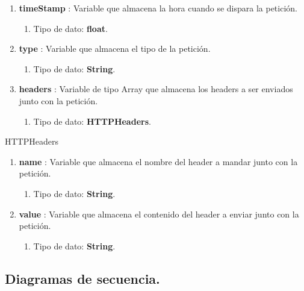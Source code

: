 \documentclass[12pt, a4paper, titlepage]{report}
\begin{document}
\begin{enumerate}
\begin{enumerate}
    		        \end{enumerate}
    		        \item \textbf{timeStamp} : Variable que almacena la hora cuando se dispara la petición.
    		        \begin{enumerate}
    		            \item Tipo de dato: \textbf{float}.
    		        \end{enumerate}
    		        \item \textbf{type} : Variable que almacena el tipo de la petición.
    		        \begin{enumerate}
    		            \item Tipo de dato: \textbf{String}.
    		        \end{enumerate}
    		        \item \textbf{headers} : Variable de tipo Array que almacena los headers a ser enviados junto con la petición.
    		        \begin{enumerate}
    		            \item Tipo de dato: \textbf{HTTPHeaders}.
    		        \end{enumerate}
			    \end{enumerate}
			    
			    HTTPHeaders
			    \begin{enumerate}
    		        \item \textbf{name} : Variable que almacena el nombre del header a mandar junto con la petición.
    		        \begin{enumerate}
    		            \item Tipo de dato: \textbf{String}.
    		        \end{enumerate}
    		        \item \textbf{value} : Variable que almacena el contenido del header a enviar junto con la petición.
    		        \begin{enumerate}
    		            \item Tipo de dato: \textbf{String}.
    		        \end{enumerate}
			    \end{enumerate}
		    
		    
			    
			\subsection{Diagramas de secuencia.}
		    	
\end{document}
